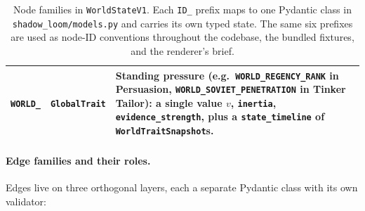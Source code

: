 \documentclass[11pt]{article}
\begin{document}
\begin{table}[h]
\begin{tabular}{@{}p{2cm}p{4.0cm}p{8.5cm}@{}}
\texttt{WORLD\_} & \texttt{GlobalTrait} & Standing pressure (e.g.\ \texttt{WORLD\_REGENCY\_RANK} in Persuasion, \texttt{WORLD\_SOVIET\_PENETRATION} in Tinker Tailor): a single value $v$, \texttt{inertia}, \texttt{evidence\_strength}, plus a \texttt{state\_timeline} of \texttt{WorldTraitSnapshot}s. \\
\bottomrule
\end{tabular}
\caption{Node families in \texttt{WorldStateV1}. Each
\texttt{ID\_} prefix maps to one Pydantic class in
\texttt{shadow\_loom/models.py} and carries its own typed state.
The same six prefixes are used as node-ID conventions throughout
the codebase, the bundled fixtures, and the renderer's brief.}
\label{tab:nodes}
\end{table}

\paragraph{Edge families and their roles.}
Edges live on three orthogonal layers, each a separate Pydantic
class with its own validator:
\end{document}
